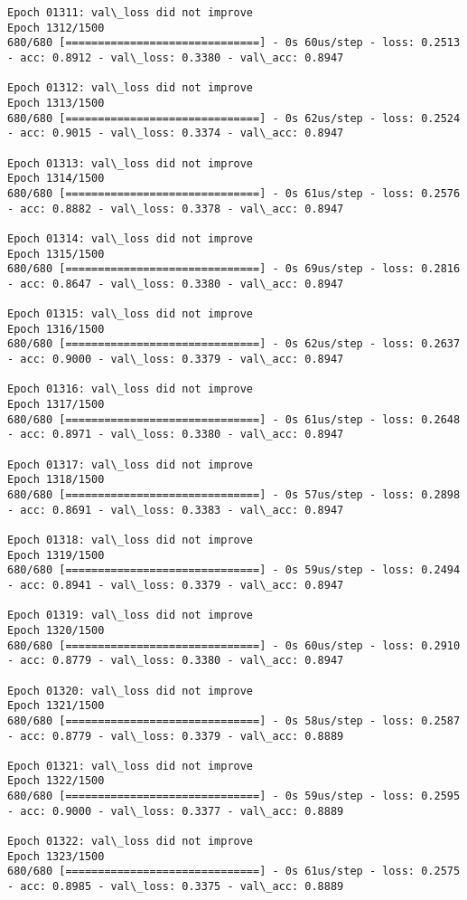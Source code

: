 \documentclass[11pt]{article}
\begin{document}
\begin{Verbatim}[commandchars=\\\{\}]
Epoch 01311: val\_loss did not improve
Epoch 1312/1500
680/680 [==============================] - 0s 60us/step - loss: 0.2513 - acc: 0.8912 - val\_loss: 0.3380 - val\_acc: 0.8947

Epoch 01312: val\_loss did not improve
Epoch 1313/1500
680/680 [==============================] - 0s 62us/step - loss: 0.2524 - acc: 0.9015 - val\_loss: 0.3374 - val\_acc: 0.8947

Epoch 01313: val\_loss did not improve
Epoch 1314/1500
680/680 [==============================] - 0s 61us/step - loss: 0.2576 - acc: 0.8882 - val\_loss: 0.3378 - val\_acc: 0.8947

Epoch 01314: val\_loss did not improve
Epoch 1315/1500
680/680 [==============================] - 0s 69us/step - loss: 0.2816 - acc: 0.8647 - val\_loss: 0.3380 - val\_acc: 0.8947

Epoch 01315: val\_loss did not improve
Epoch 1316/1500
680/680 [==============================] - 0s 62us/step - loss: 0.2637 - acc: 0.9000 - val\_loss: 0.3379 - val\_acc: 0.8947

Epoch 01316: val\_loss did not improve
Epoch 1317/1500
680/680 [==============================] - 0s 61us/step - loss: 0.2648 - acc: 0.8971 - val\_loss: 0.3380 - val\_acc: 0.8947

Epoch 01317: val\_loss did not improve
Epoch 1318/1500
680/680 [==============================] - 0s 57us/step - loss: 0.2898 - acc: 0.8691 - val\_loss: 0.3383 - val\_acc: 0.8947

Epoch 01318: val\_loss did not improve
Epoch 1319/1500
680/680 [==============================] - 0s 59us/step - loss: 0.2494 - acc: 0.8941 - val\_loss: 0.3379 - val\_acc: 0.8947

Epoch 01319: val\_loss did not improve
Epoch 1320/1500
680/680 [==============================] - 0s 60us/step - loss: 0.2910 - acc: 0.8779 - val\_loss: 0.3380 - val\_acc: 0.8947

Epoch 01320: val\_loss did not improve
Epoch 1321/1500
680/680 [==============================] - 0s 58us/step - loss: 0.2587 - acc: 0.8779 - val\_loss: 0.3379 - val\_acc: 0.8889

Epoch 01321: val\_loss did not improve
Epoch 1322/1500
680/680 [==============================] - 0s 59us/step - loss: 0.2595 - acc: 0.9000 - val\_loss: 0.3377 - val\_acc: 0.8889

Epoch 01322: val\_loss did not improve
Epoch 1323/1500
680/680 [==============================] - 0s 61us/step - loss: 0.2575 - acc: 0.8985 - val\_loss: 0.3375 - val\_acc: 0.8889


\end{Verbatim}
\end{document}
